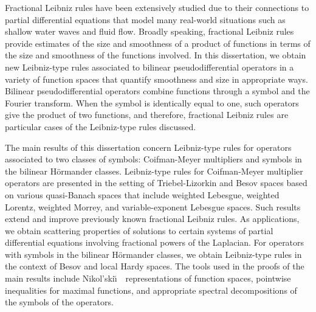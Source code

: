 
\pagestyle{empty}
\setlength{\baselineskip}{0.8cm}



Fractional Leibniz rules have been extensively studied due to their connections to partial
differential equations that model many real-world situations such as shallow water waves
and fluid flow. Broadly speaking, fractional Leibniz rules provide estimates of the size and smoothness of a product of functions in terms of the size and smoothness of the functions involved. In this dissertation, we obtain new Leibniz-type rules associated to bilinear pseudodifferential operators in a variety of function spaces that quantify smoothness and size in appropriate ways. Bilinear pseudodifferential operators combine functions through a symbol and the Fourier transform. When the symbol is identically equal to one, such operators give the product of two functions, and therefore, fractional Leibniz rules are particular cases of the Leibniz-type rules discussed.

The main results of this dissertation concern Leibniz-type rules for operators associated to two classes of symbols: Coifman-Meyer multipliers and symbols in the bilinear H\"ormander classes. Leibniz-type rules for Coifman-Meyer multiplier operators are presented in the setting of Triebel-Lizorkin and Besov spaces based on various quasi-Banach spaces that include weighted Lebesgue, weighted Lorentz, weighted Morrey, and variable-exponent Lebesgue spaces. Such results extend and improve previously known fractional Leibniz rules. As applications, we obtain scattering properties of solutions to certain systems of partial differential equations involving fractional powers of the Laplacian. For operators with symbols in the bilinear H\"ormander classes, we obtain Leibniz-type rules in the context of Besov and local Hardy spaces. The tools used in the proofs of the main results include Nikol'ski\u\i$\text{ }$ representations of function spaces, pointwise inequalities for maximal functions, and appropriate spectral decompositions of the symbols of the operators.